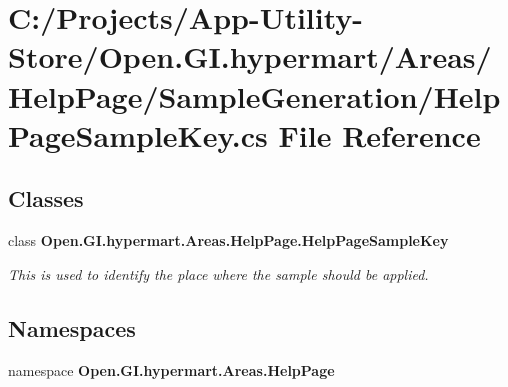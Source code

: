 \section{C\+:/\+Projects/\+App-\/\+Utility-\/\+Store/\+Open.G\+I.\+hypermart/\+Areas/\+Help\+Page/\+Sample\+Generation/\+Help\+Page\+Sample\+Key.cs File Reference}
\label{_help_page_sample_key_8cs}
\subsection*{Classes}
\begin{DoxyCompactItemize}
\item 
class \textbf{ Open.\+G\+I.\+hypermart.\+Areas.\+Help\+Page.\+Help\+Page\+Sample\+Key}
\begin{DoxyCompactList}\small\item\em This is used to identify the place where the sample should be applied. \end{DoxyCompactList}\end{DoxyCompactItemize}
\subsection*{Namespaces}
\begin{DoxyCompactItemize}
\item 
namespace \textbf{ Open.\+G\+I.\+hypermart.\+Areas.\+Help\+Page}
\end{DoxyCompactItemize}
